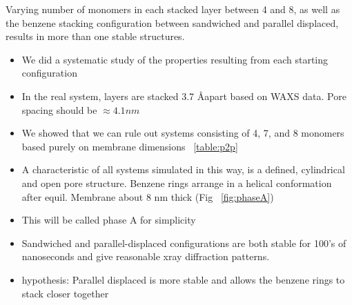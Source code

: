 \documentclass{article}
\begin{document}
	Varying number of monomers in each stacked layer between 4 and 8, as well as the benzene stacking configuration between sandwiched and parallel displaced, results in more than one stable structures.
        \begin{itemize}
                \item We did a systematic study of the properties resulting from each starting configuration
		\item In the real system, layers are stacked 3.7 \AA apart based on WAXS data. Pore spacing should be $ \approx 4.1 nm $
		\item We showed that we can rule out systems consisting of 4, 7, and 8 monomers based purely on membrane dimensions ~\ref{table:p2p}  %
		\item A characteristic of all systems simulated in this way, is a defined, cylindrical and open pore structure. Benzene rings arrange in a helical conformation after equil. Membrane about 8 nm thick (Fig ~\ref{fig:phaseA}) %
		\item This will be called phase A for simplicity  %
		\item Sandwiched and parallel-displaced configurations are both stable for 100's of nanoseconds and give reasonable xray diffraction patterns.
		\item hypothesis: Parallel displaced is more stable and allows the benzene rings to stack closer together  
	\end{itemize} 

\end{document}

